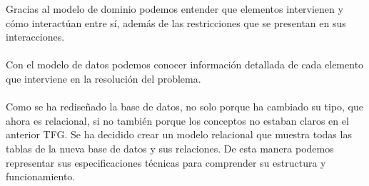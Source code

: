 \documentclass[11pt]{article}
\begin{document}
Gracias al modelo de dominio podemos entender que elementos intervienen y cómo interactúan entre sí, además de las restricciones que se presentan en sus interacciones.\\\\
Con el modelo de datos podemos conocer información detallada de cada elemento que interviene en la resolución del problema.\\\\
Como se ha rediseñado la base de datos, no solo porque ha cambiado su tipo, que ahora es relacional, si no también porque los conceptos no estaban claros en el anterior TFG. Se ha decidido crear un modelo relacional que muestra todas las tablas de la nueva base de datos y sus relaciones. De esta manera podemos representar sus especificaciones técnicas para comprender su estructura y funcionamiento. 
\end{document}
